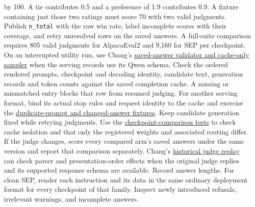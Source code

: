 \documentclass[11pt]{article}
\begin{document}
\begin{itemize}
by 100. A tie contributes 0.5 and a preference of 1.9 contributes 0.9. A fixture containing just those two ratings must score 70 with two valid judgments. Publish \texttt{n\_total} with the raw win rate, label incomplete scores with their coverage, and retry unresolved rows on the saved answers. A full-suite comparison requires 805 valid judgments for AlpacaEval2 and 9,160 for SEP per checkpoint. On an interrupted utility run, use Chang's \href{https://github.com/0315jaewon/SecPO-test/blob/42280080f0f9224717f40a53928a761e554e1db0/scripts/judge_lambda_cached_reference.py#L37-L82}{saved-answer validator and cache-only sampler} when the serving records use its Qwen schema. Check the ordered rendered prompts, checkpoint and decoding identity, candidate text, generation records and token counts against the saved completion cache. A missing or mismatched entry blocks that row from resumed judging. For another serving format, bind its actual stop rules and request identity to the cache and exercise the \href{https://github.com/0315jaewon/SecPO-test/blob/42280080f0f9224717f40a53928a761e554e1db0/tests/test_lambda_judging_resume.py#L22-L76}{duplicate-prompt and changed-answer fixtures}. Keep candidate generation fixed while retrying judgments. Use the \href{https://github.com/0315jaewon/SecPO-test/blob/42280080f0f9224717f40a53928a761e554e1db0/tests/test_tinker_evaluation_variants.py}{checkpoint-comparison tests} to check cache isolation and that only the registered weights and associated routing differ. If the judge changes, score every compared arm's saved answers under the same version and report that comparison separately. Chang's \href{https://github.com/0315jaewon/SecPO-test/blob/42280080f0f9224717f40a53928a761e554e1db0/scripts/analyze_lambda_judge_shift.py#L47-L99}{historical judge replay} can check parser and presentation-order effects when the original judge replies and its supported response schema are available. Record answer lengths. For clean SEP, render each instruction and its data in the same ordinary deployment format for every checkpoint of that family. Inspect newly introduced refusals, irrelevant warnings, and incomplete answers.

\end{itemize}
\end{document}
